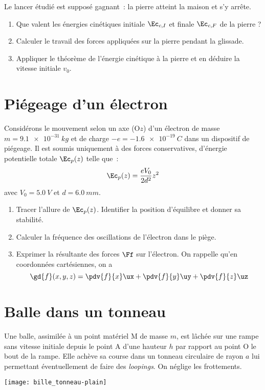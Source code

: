 \documentclass[a4paper, 12pt, final, garamond]{book}
\begin{document}
Le lancer étudié est supposé gagnant~: la pierre atteint la maison et s'y
arrête. \bigbreak

\begin{enumerate}
    \item Que valent les énergies cinétiques initiale $\Ec_{c,I}$ et finale
        $\Ec_{c,F}$ de la pierre ?
    \item Calculer le travail des forces appliquées sur la pierre pendant la
        glissade.
    \item Appliquer le théorème de l'énergie cinétique à la pierre et en déduire
        la vitesse initiale $v_0$.
\end{enumerate}

\section{Piégeage d'un électron}
Considérons le mouvement selon un axe (O$z$) d'un électron de masse $m =
\SI{9.1e-31}{kg}$ et de charge $-e = \SI{-1.6e-19}{C}$ dans un dispositif de
piégeage. Il est soumis uniquement à des forces conservatives, d'énergie
potentielle totale $\Ec_p(z)$ telle que~:
\[\Ec_p(z) = \frac{eV_0}{2d^2}z^2\]
avec $V_0 = \SI{5.0}{V}$ et $d = \SI{6.0}{mm}$. \bigbreak
\begin{enumerate}
    \item Tracer l'allure de $\Ec_p(z)$. Identifier la position d'équilibre et
        donner sa stabilité.
    \item Calculer la fréquence des oscillations de l'électron dans le piège.
    \item Exprimer la résultante des forces $\Ff$ sur l'électron. On rappelle
        qu'en coordonnées cartésiennes, on a
        \[\gd{f}(x,y,z) = \pdv{f}{x}\ux + \pdv{f}{y}\uy + \pdv{f}{z}\uz \]
\end{enumerate}

\section{Balle dans un tonneau}
\begin{minipage}{0.60\linewidth}
    Une balle, assimilée à un point matériel M de masse $m$, est lâchée sur une
    rampe sans vitesse initiale depuis le point A d'une hauteur $h$ par rapport
    au point O le bout de la rampe. Elle achève sa course dans un tonneau
    circulaire de rayon $a$ lui permettant éventuellement de faire des
    \textit{loopings}. On néglige les frottements.
\end{minipage}
\hfill
\begin{minipage}{0.35\linewidth}
    \begin{center}
        \texttt{[image: bille\_tonneau-plain]}
    \end{center}
\end{minipage}
\end{document}
